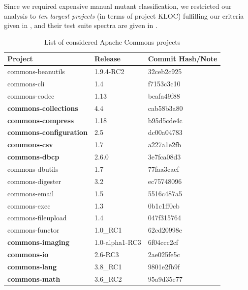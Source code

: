 \documentclass[sigconf]{acmart}
\begin{document}
Since we required expensive manual mutant classification, %
we restricted our analysis 
to \emph{ten largest projects} (in terms of project KLOC)
fulfilling our
criteria given in , and their test suite spectra are given in .

\begin{table}[t]
  \caption{List of considered Apache Commons projects}
    \small
  \begin{tabular}{|l|l|l| }
    \hline
    \textbf{Project} & \textbf{Release} & \textbf{Commit Hash/Note} \\
    \hline
\rowcolor{yellow}
    commons-beanutils     & 1.9.4-RC2      	& 32ceb2c925\\ 
    commons-cli           & 1.4            			& f7153c3c10\\ 
\rowcolor{yellow}
    commons-codec         & 1.13           		& beafa49f88\\ 
    \textbf{commons-collections}   & 4.4       	& cab58b3a80\\ 
\rowcolor{yellow}
    \textbf{commons-compress}      & 1.18      	& b95d5cde4c\\ 
    \textbf{commons-configuration} & 2.5       	& dc00a04783\\ 
\rowcolor{yellow}
    \textbf{commons-csv}           & 1.7            	& a227a1e2fb\\ 
    \textbf{commons-dbcp}          & 2.6.0         	& 3e7fca08d3\\ 
\rowcolor{yellow}
    commons-dbutils       & 1.7            		& 77faa3caef\\
    commons-digester      & 3.2            		& ec75748096\\ 
\rowcolor{yellow}
    commons-email         & 1.5            		& 5516c487a5\\ 
    commons-exec          & 1.3            		& 0b1c1ff0cb\\ 
\rowcolor{yellow}
    commons-fileupload    & 1.4            		& 047f315764\\
    commons-functor       & 1.0\_RC1       		& 62cd20998e\\ 
\rowcolor{yellow}
    \textbf{commons-imaging}       & 1.0-alpha1-RC3 & 6f04ccc2cf\\ 
    \textbf{commons-io}            & 2.6-RC3        & 2ae025fe5c\\ 
\rowcolor{yellow}
    \textbf{commons-lang}          & 3.8\_RC1   	& 9801e2fb9f\\ 
    \textbf{commons-math}          & 3.6\_RC2   & 95a9d35e77\\ 

\end{tabular}
\end{table}
\end{document}

